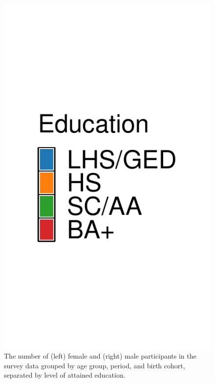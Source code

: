 \begin{figure}[!ht]
\begin{minipage}{.2\textwidth}
        \includegraphics[width = \textwidth]{Figures/number_prop_legend_m.pdf}
    \end{minipage}
    \caption{The number of (left) female and (right) male participants in the survey data grouped by age group, period, and birth cohort, separated by level of attained education.}
    \label{figure:data_numb}
\end{figure}

